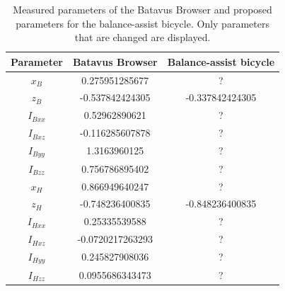 \documentclass[12pt]{article}
\begin{document}
\begin{table}[]
    \centering
    \caption{Measured parameters of the Batavus Browser and proposed parameters for the balance-assist bicycle. Only parameters that are changed are displayed.}
    \label{parameter-changes}
    \begin{tabular}{c|c|c}
        \textbf{Parameter} & \textbf{Batavus Browser} & \textbf{Balance-assist bicycle} \\ \hline
        $x_B$              & 0.275951285677           & ?                               \\
        $z_B$              & -0.537842424305          & -0.337842424305                 \\
        $I_{Bxx}$          & 0.52962890621            & ?                               \\
        $I_{Bxz}$          & -0.116285607878          & ?                               \\
        $I_{Byy}$          & 1.3163960125             & ?                               \\
        $I_{Bzz}$          & 0.756786895402           & ?                               \\
        $x_H$              & 0.866949640247           & ?                               \\
        $z_H$              & -0.748236400835          & -0.848236400835                 \\
        $I_{Hxx}$          & 0.25335539588            & ?                               \\
        $I_{Hxz}$          & -0.0720217263293         & ?                               \\
        $I_{Hyy}$          & 0.245827908036           & ?                               \\   
        $I_{Hzz}$          & 0.0955686343473          & ?
    \end{tabular}
\end{table}




\end{document}
